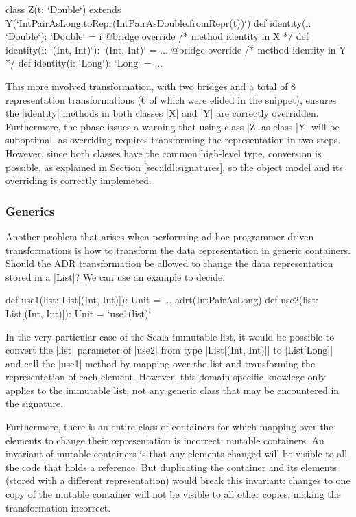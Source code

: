 \begin{lstlisting-nobreak}
class Z(t: `Double`) extends Y(`IntPairAsLong.toRepr(IntPairAsDouble.fromRepr(t))`) {
  def identity(i: `Double`): `Double` = i
  @bridge override /* method identity in X */
  def identity(i: `(Int, Int)`): `(Int, Int)` = ...
  @bridge override /* method identity in Y */
  def identity(i: `Long`): `Long` = ...
}
\end{lstlisting-nobreak}

This more involved transformation, with two bridges and a total of 8 representation transformations (6 of which were elided in the snippet), ensures the |identity| methods in both classes |X| and |Y| are correctly overridden. Furthermore, the \bridge{} phase issues a warning that using class |Z| as class |Y| will be suboptimal, as overriding requires transforming the representation in two steps. However, since both classes have the common high-level type, conversion is possible, as explained in Section \ref{sec:ildl:signatures}, so the object model and its overriding is correctly implemeted.

\subsubsection{Generics}
Another problem that arises when performing ad-hoc programmer-driven transformations is how to transform the data representation in generic containers. Should the ADR transformation be allowed to change the data representation stored in a |List|? We can use an example to decide:

\begin{lstlisting-nobreak}
def use1(list: List[(Int, Int)]): Unit = ...
adrt(IntPairAsLong) {
  def use2(list: List[(Int, Int)]): Unit = `use1(list)`
}
\end{lstlisting-nobreak}

In the very particular case of the Scala immutable list, it would be possible to convert the |list| parameter of |use2| from type |List[(Int, Int)]| to |List[Long]| and call the |use1| method by mapping over the list and transforming the representation of each element. However, this domain-specific knowlege only applies to the immutable list, not any generic class that may be encountered in the signature.

Furthermore, there is an entire class of containers for which mapping over the elements to change their representation is incorrect: mutable containers. An invariant of mutable containers is that any elements changed will be visible to all the code that holds a reference. But duplicating the container and its elements (stored with a different representation) would break this invariant: changes to one copy of the mutable container will not be visible to all other copies, making the transformation incorrect.

